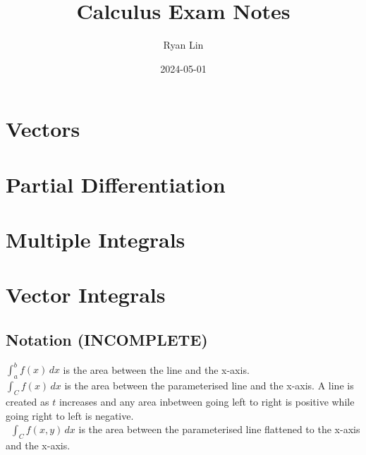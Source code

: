 \documentclass{article}
\title{Calculus Exam Notes}
\author{Ryan Lin}
\date{2024-05-01}
\begin{document}
	\maketitle
	
	
	\section{Vectors}
	
	
	\section{Partial Differentiation}
	
	
	\section{Multiple Integrals}
	
	\section{Vector Integrals}
	
		\subsection{Notation (INCOMPLETE)}
			$\int_{a}^{b} f(x) \,dx$ is the area between the line and the x-axis. \\
			$\int_{C} f(x) \,dx$ is the area between the parameterised line and the x-axis. A line is created as $t$ increases and any area inbetween going left to right is positive while going right to left is negative. \\
			\
			$\int_{C} f(x,y) \,dx$ is the area between the parameterised line flattened to the x-axis and the x-axis.
	
\end{document}
